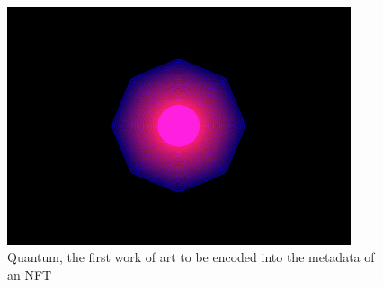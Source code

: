 \documentclass[../main.tex]{subfiles}
\begin{document}
\begin{figure}[htp]
    \centering
    \includegraphics[width=0.9\textwidth]{../Images/02_QuantumNFT.png}
    \caption{Quantum, the first work of art to be encoded into the metadata of an NFT \cite{Exmundo2023}}
    \label{fig:quantum_nft}
\end{figure}
\end{document}
